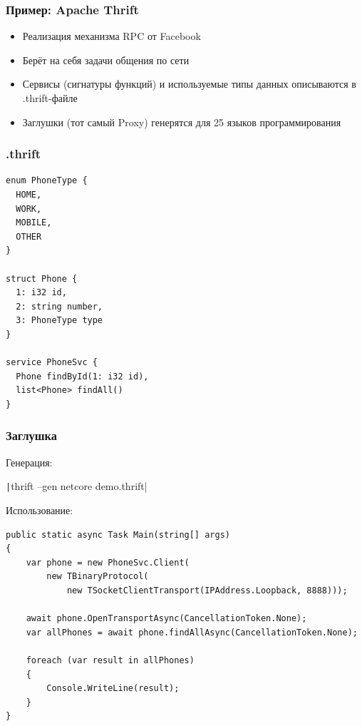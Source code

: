 \documentclass[xetex,mathserif,serif]{beamer}
\begin{document}
	\begin{frame}
		\frametitle{Пример: Apache Thrift}
		\begin{itemize}
			\item Реализация механизма RPC от Facebook
			\item Берёт на себя задачи общения по сети
			\item Сервисы (сигнатуры функций) и используемые типы данных описываются в .thrift-файле
			\item Заглушки (тот самый Proxy) генерятся для 25 языков программирования
		\end{itemize}
	\end{frame}

	\begin{frame}[fragile]
		\frametitle{.thrift}
		\begin{small}
			\begin{verbatim}
enum PhoneType {
  HOME,
  WORK,
  MOBILE,
  OTHER
}

struct Phone {
  1: i32 id,
  2: string number,
  3: PhoneType type
}

service PhoneSvc {
  Phone findById(1: i32 id),
  list<Phone> findAll()
}
			\end{verbatim}
		\end{small}
	\end{frame}

	\begin{frame}[fragile]
		\frametitle{Заглушка}
		\begin{small}
			Генерация:

			\texttt|thrift --gen netcore demo.thrift|

			\vspace{3mm}

			Использование:
		\begin{verbatim}
public static async Task Main(string[] args)
{
    var phone = new PhoneSvc.Client(
        new TBinaryProtocol(
            new TSocketClientTransport(IPAddress.Loopback, 8888)));

    await phone.OpenTransportAsync(CancellationToken.None);
    var allPhones = await phone.findAllAsync(CancellationToken.None);

    foreach (var result in allPhones)
    {
        Console.WriteLine(result);
    }
}
			\end{verbatim}
		\end{small}
	\end{frame}
\end{document}
